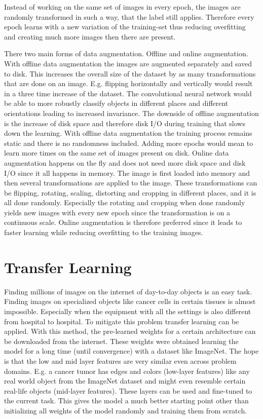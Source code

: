 Instead of working on the same set of images in every epoch, the images are randomly transformed in such a way, that the label still applies. Therefore every epoch learns with a new variation of the training-set thus reducing overfitting and creating much more images then there are present.

There two main forms of data augmentation. Offline and online augmentation. With offline data augmentation the images are augmented separately and saved to disk. This increases the overall size of the dataset by as many transformations that are done on an image. E.g. flipping horizontally and vertically would result in a three time increase of the dataset. The convolutional neural network would be able to more robustly classify objects in different places and different orientations leading to increased invariance. The downside of offline augmentation is the increase of disk space and therefore disk I/O during training that slows down the learning. With offline data augmentation the training process remains static and there is no randomness included. Adding more epochs would mean to learn more times on the same set of images present on disk.
Online data augmentation happens on the fly and does not need more disk space and disk I/O since it all happens in memory. The image is first loaded into memory and then several transformations are applied to the image. These transformations can be flipping, rotating, scaling, distorting and cropping in different places, and it is all done randomly. Especially the rotating and cropping when done randomly yields new images with every new epoch since the transformation is on a continuous scale. Online augmentation is therefore preferred since it leads to faster learning while reducing overfitting to the training images.

\section{Transfer Learning}

Finding millions of images on the internet of day-to-day objects is an easy task. Finding images on specialized objects like cancer cells in certain tissues is almost impossible. Especially when the equipment with all the settings is also different from hospital to hospital. To mitigate this problem transfer learning can be applied. With this method, the pre-learned weights for a certain architecture can be downloaded from the internet. These weights were obtained learning the model for a long time (until convergence) with a dataset like ImageNet. The hope is that the low and mid layer features are very similar even across problem domains. E.g. a cancer tumor has edges and colors (low-layer features) like any real world object from the ImageNet dataset and might even resemble certain real-life objects (mid-layer features). These layers can be used and fine-tuned to the current task. This gives the model a much better starting point other than initializing all weights of the model randomly and training them from scratch. 

